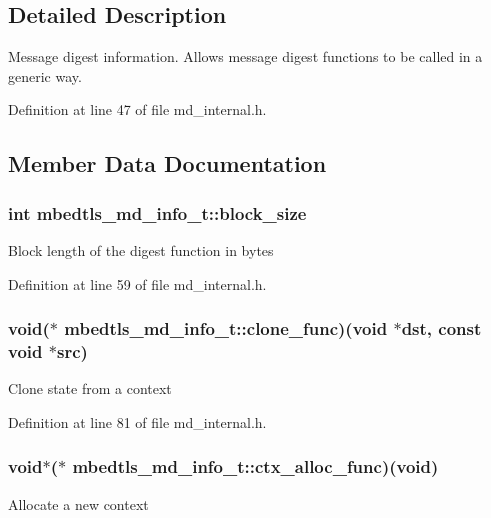 \subsection{Detailed Description}
Message digest information. Allows message digest functions to be called in a generic way. 

Definition at line 47 of file md\-\_\-internal.\-h.



\subsection{Member Data Documentation}
\hypertarget{structmbedtls__md__info__t_a2090181c3aef5c7d692147340a6bdf99}{
\subsubsection[{block\-\_\-size}]{\setlength{\rightskip}{0pt plus 5cm}int mbedtls\-\_\-md\-\_\-info\-\_\-t\-::block\-\_\-size}}\label{structmbedtls__md__info__t_a2090181c3aef5c7d692147340a6bdf99}
Block length of the digest function in bytes 

Definition at line 59 of file md\-\_\-internal.\-h.

\hypertarget{structmbedtls__md__info__t_ae5ad4251218debad0702d67d4dd176f9}{
\subsubsection[{clone\-\_\-func}]{\setlength{\rightskip}{0pt plus 5cm}void($\ast$ mbedtls\-\_\-md\-\_\-info\-\_\-t\-::clone\-\_\-func)(void $\ast$dst, const void $\ast$src)}}\label{structmbedtls__md__info__t_ae5ad4251218debad0702d67d4dd176f9}
Clone state from a context 

Definition at line 81 of file md\-\_\-internal.\-h.

\hypertarget{structmbedtls__md__info__t_a751f793f0b843972d8a979544785bb61}{
\subsubsection[{ctx\-\_\-alloc\-\_\-func}]{\setlength{\rightskip}{0pt plus 5cm}void$\ast$($\ast$ mbedtls\-\_\-md\-\_\-info\-\_\-t\-::ctx\-\_\-alloc\-\_\-func)(void)}}\label{structmbedtls__md__info__t_a751f793f0b843972d8a979544785bb61}
Allocate a new context 

